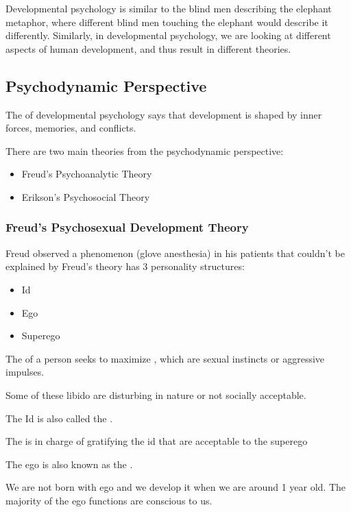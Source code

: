 \documentclass[../main/main.tex]{subfiles}
\begin{document}
Developmental psychology is similar to the blind men describing the elephant metaphor, where different blind men touching the elephant would describe it differently. Similarly, in developmental psychology, we are looking at different aspects of human development, and thus result in different theories.

\subsection{Psychodynamic Perspective}
\begin{definition}
  The  of developmental psychology says that development is shaped by inner forces, memories, and conflicts.
\end{definition}
There are two main theories from the psychodynamic perspective:
\begin{itemize}
  \item Freud's Psychoanalytic Theory
        \item Erikson’s Psychosocial Theory
\end{itemize}
\subsubsection{Freud's Psychosexual Development Theory}
Freud observed a phenomenon (glove anesthesia) in his patients that couldn't be explained by Freud's theory has 3 personality structures:
\begin{itemize}
  \item Id
        \item Ego
        \item Superego
\end{itemize}

\begin{definition}
   
The  of a person seeks to maximize , which are sexual instincts or aggressive impulses.
\end{definition}
\begin{remark}
Some of these libido are disturbing in nature or not socially acceptable.
\end{remark}
\begin{remark}
  The Id is also called the .
\end{remark}

\begin{definition}
  The  is in charge of gratifying the id that are acceptable to the superego
\end{definition}
\begin{remark}
  The ego is also known as the .
\end{remark}
\begin{remark}
We are not born with ego and we develop it when we are around 1 year old.
The majority of the ego functions are conscious to us.
\end{remark}
\end{document}
